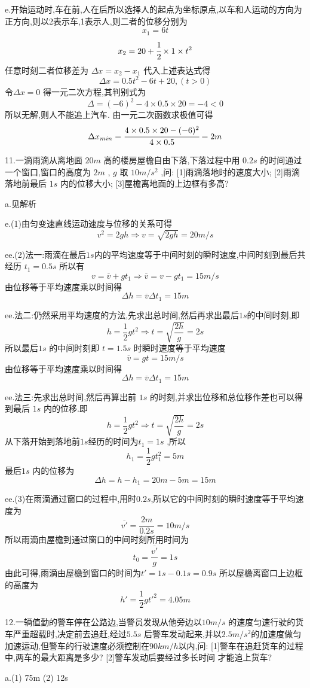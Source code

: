 \begin{calculate}
e.开始运动时,车在前,人在后所以选择人的起点为坐标原点,以车和人运动的方向为正方向,则以2表示车,1表示人,则二者的位移分别为
$$x_1=6t$$
$$x_2=20+\cfrac{1}{2}\times 1\times t^2$$
任意时刻二者位移差为 $\Delta x = x_2-x_1$ 代入上述表达式得
$$\Delta x= 0.5t^2-6t +20 ,(t>0)$$
令$\Delta x=0$ 得一元二次方程,其判别式为
$$\Delta = (-6)^2-4\times 0.5 \times 20 =-4<0$$
所以无解,则人不能追上汽车.
由一元二次函数求极值可得
$$\Delta x_{min}=\cfrac{4\times 0.5 \times 20 - (-6)^2}{4\times 0.5}=2m$$

11.一滴雨滴从离地面 $20m$ 高的楼房屋檐自由下落,下落过程中用 $0.2s$ 的时间通过一个窗口,窗口的高度为 $2m$ , $g$ 取 $10m/s^2$ ,问:
[1]雨滴落地时的速度大小;
[2]雨滴落地前最后 $1s$ 内的位移大小;
[3]屋檐离地面的上边框有多高?

a.见解析

e.(1)由匀变速直线运动速度与位移的关系可得
$$v^2=2gh \Longrightarrow v=\sqrt{2gh}=20m/s$$

ee.(2)法一:雨滴在最后$1s$内的平均速度等于中间时刻的瞬时速度,中间时刻到最后共经历 $t_1=0.5s$ 所以有
$$v=\overline{v}+gt_1 \Longrightarrow \overline{v}=v-gt_1=15m/s$$
由位移等于平均速度乘以时间得
$$\Delta h=\overline{v}\Delta t_1 =15m$$

ee.法二:仍然采用平均速度的方法,先求出总时间,然后再求出最后$1s$的中间时刻,即
$$h=\frac{1}{2}gt^2 \Longrightarrow t=\sqrt{\frac{2h}{g}}=2s$$
所以最后$1s$ 的中间时刻即 $t=1.5s$ 时瞬时速度等于平均速度
$$\overline{v}=gt=15m/s$$
由位移等于平均速度乘以时间得
$$\Delta h=\overline{v}\Delta t_1 =15m$$

ee.法三:先求出总时间,然后再算出前 $1s$ 的时刻,并求出位移和总位移作差也可以得到最后 $1s$ 内的位移.即
$$h=\frac{1}{2}gt^2 \Longrightarrow t=\sqrt{\frac{2h}{g}}=2s$$
从下落开始到落地前$1s$经历的时间为$t_1=1s$ ,所以
$$h_1=\frac{1}{2}gt_1^2=5m$$
最后$1s$ 内的位移为
$$\Delta h=h-h_1=20m-5m=15m$$


ee.(3)在雨滴通过窗口的过程中,用时$0.2s$,所以它的中间时刻的瞬时速度等于平均速度为
$$\overline{v'}=\frac{2m}{0.2s}=10m/s$$
所以雨滴由屋檐到通过窗口的中间时刻所用时间为
$$t_0=\frac{\overline{v'}}{g}=1s$$
由此可得,雨滴由屋檐到窗口的时间为$t'=1s-0.1s=0.9s$ 所以屋檐离窗口上边框的高度为
$$h'=\frac{1}{2}gt'^2=4.05m$$

12.一辆值勤的警车停在公路边,当警员发现从他旁边以$10m/s$ 的速度匀速行驶的货车严重超载时,决定前去追赶,经过$5.5s$ 后警车发动起来,并以$2.5m/s^2$的加速度做匀加速运动,但警车的行驶速度必须控制在$90km/h$以内,问:
[1]警车在追赶货车的过程中,两车的最大距离是多少?
[2]警车发动后要经过多长时间 才能追上货车?

a.(1) 75m \qquad (2) 12s


\end{calculate}
